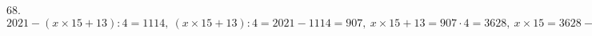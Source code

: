 68. $2021-(x\times15+13):4=1114,\ (x\times15+13):4=2021-1114=907,\ x\times15+13=907\cdot4=3628,\ x\times15=3628-13=3615,\ x=3615:15=241.$\\
